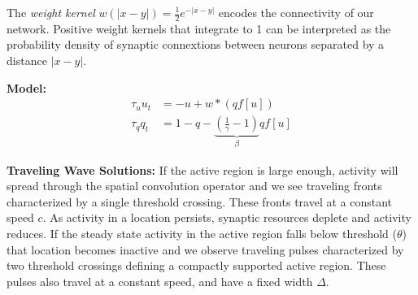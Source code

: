\documentclass[landscape,final]{baposter}
\begin{document}
\begin{poster}
{	The \textit{weight kernel} $w(|x - y|) = \tfrac{1}{2}e^{-|x - y|}$ encodes the connectivity of our network. Positive weight kernels that integrate to 1 can be interpreted as the probability density of synaptic connextions between neurons separated by a distance $|x - y|$.
	
	\textbf{Model:}
	\begin{align*}
		\tau_u u_t &= -u + w * (q f[u]) \\
		\tau_q q_t &= 1 - q - \underbrace{(\tfrac{1}{\gamma} - 1)}_{\beta} q f[u]
	\end{align*}
	
	\textbf{Traveling Wave Solutions:}
	If the active region is large enough, activity will spread through the spatial convolution operator and we see traveling fronts characterized by a single threshold crossing. These fronts travel at a constant speed $c$. As activity in a location persists, synaptic resources deplete and activity reduces. If the steady state activity in the active region falls below threshold ($\theta$) that location becomes inactive and we observe traveling pulses characterized by two threshold crossings defining a compactly supported active region. These pulses also travel at a constant speed, and have a fixed width $\Delta$.
	\bigbreak
	
}
\end{poster}
\end{document}
